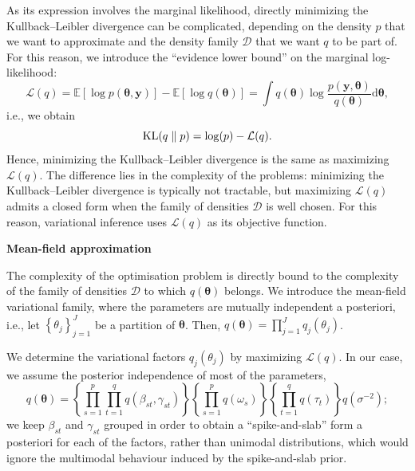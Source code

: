 \documentclass[final]{beamer}
\DeclareMathOperator*{\KL}{{\rm KL}}
\begin{document}
\begin{multicols*}{3}
As its expression involves the marginal likelihood, directly minimizing the Kullback--Leibler divergence can be complicated, depending on the density $p$ that we want to approximate and the density family $\mathcal{D}$ that we want $q$ to be part of. For this reason, we introduce the ``evidence lower bound'' on the marginal log-likelihood:
\begin{equation*}
\mathcal{L}(q) = \mathbb{E}\left[\log p(\boldsymbol{\theta},\boldsymbol{y})\right] - \mathbb{E}\left[\log q(\boldsymbol{\theta})\right] =\int q(\boldsymbol{\theta})\log\frac{p(\boldsymbol{y},\boldsymbol{\theta})}{q(\boldsymbol{\theta})}\mathrm{d}\boldsymbol{\theta},
\end{equation*}
i.e., we obtain
\begin{equation*}
\KL(q\parallel p) = \log(p) - \mathcal{L}(q).
\end{equation*}
Hence, minimizing the Kullback--Leibler divergence is the same as maximizing $\mathcal{L}(q)$. The difference lies in the complexity of the problems: minimizing the Kullback--Leibler divergence is typically not tractable, but maximizing $\mathcal{L}(q)$ admits a closed form when the family of densities $\mathcal{D}$ is well chosen. For this reason, variational inference uses $\mathcal{L}(q)$ as its objective function.

\vspace{1em}

\textbf{\large Mean-field approximation}

\vspace{1em}
The complexity of the optimisation problem is directly bound to the complexity of the family of densities $\mathcal{D}$ to which $q(\boldsymbol{\theta})$ belongs. We introduce the mean-field variational family, where the parameters are mutually independent a posteriori, i.e., let $\left\lbrace \theta_j\right\rbrace_{j=1}^J$ be a partition of $\boldsymbol{\theta}$. Then,
$q(\boldsymbol{\theta}) = \prod_{j=1}^J q_j(\theta_j)$.

We determine the variational factors $q_j(\theta_j)$ by maximizing $\mathcal{L}(q)$. In our case, we assume the posterior independence of most of the parameters,
\begin{equation*}
q(\boldsymbol{\theta}) =\left\lbrace\prod_{s=1}^p \prod_{t=1}^q q(\beta_{st}, \gamma_{st})\right\rbrace \left\lbrace\prod_{s=1}^p  q(\omega_s)\right\rbrace \left\lbrace\prod_{t=1}^q q(\tau_t)\right\rbrace q(\sigma^{-2});
\end{equation*}
we keep $\beta_{st}$ and $\gamma_{st}$ grouped in order to obtain a ``spike-and-slab'' form a posteriori for each of the factors, rather than unimodal distributions, which would ignore the multimodal behaviour induced by the spike-and-slab prior.


\end{multicols*}
\end{document}
